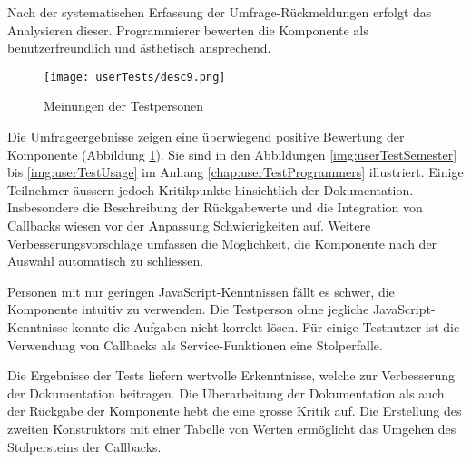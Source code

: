 Nach der systematischen Erfassung der Umfrage-Rückmeldungen erfolgt das Analysieren dieser. 
Programmierer bewerten die Komponente als benutzerfreundlich und ästhetisch ansprechend. 

\begin{figure}[!htb]
    \centering
    \texttt{[image: userTests/desc9.png]}
    \caption{\centering Meinungen der Testpersonen}
    \label{img:userTestsDescription}
\end{figure}

Die Umfrageergebnisse zeigen eine überwiegend positive Bewertung der Komponente (Abbildung \ref{img:userTestsDescription}). 
Sie sind in den Abbildungen \ref{img:userTestSemester} bis \ref{img:userTestUsage} im Anhang \ref{chap:userTestProgrammers} illustriert. 
Einige Teilnehmer äussern jedoch Kritikpunkte hinsichtlich der Dokumentation. 
Insbesondere die Beschreibung der Rückgabewerte und die Integration von Callbacks wiesen vor der Anpassung Schwierigkeiten auf. 
Weitere Verbesserungsvorschläge umfassen die Möglichkeit, die Komponente nach der Auswahl automatisch zu schliessen. 

Personen mit nur geringen JavaScript-Kenntnissen fällt es schwer, die Komponente intuitiv zu verwenden. 
Die Testperson ohne jegliche JavaScript-Kenntnisse konnte die Aufgaben nicht korrekt lösen. 
Für einige Testnutzer ist die Verwendung von Callbacks als Service-Funktionen eine Stolperfalle. 

Die Ergebnisse der Tests liefern wertvolle Erkenntnisse, welche zur Verbesserung der Dokumentation beitragen. 
Die Überarbeitung der Dokumentation als auch der Rückgabe der Komponente hebt die eine grosse Kritik auf. 
Die Erstellung des zweiten Konstruktors mit einer Tabelle von Werten ermöglicht das Umgehen des Stolpersteins der Callbacks. 

